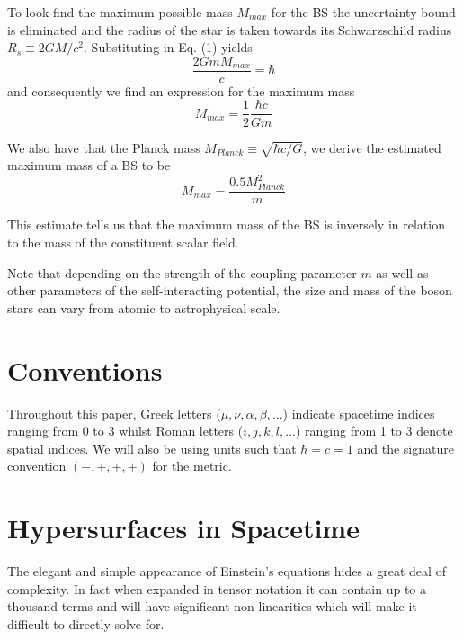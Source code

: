 \documentclass[12pt]{article}
\numberwithin{equation}{section}
\numberwithin{theorem}{subsection}
\begin{document}
 To look find the maximum possible mass $M_{max}$ for the BS the uncertainty bound is eliminated and the radius of the star is taken towards its Schwarzschild radius $R_{s} \equiv 2GM/c^2$. Substituting in Eq. (1) yields \begin{equation}

     \frac{2 Gm  M_{max}}{c} = \hbar

 \end{equation} and consequently we find an expression for the maximum mass \begin{equation}

     M_{max} = \frac{1}{2} \frac{\hbar c}{Gm}

 \end{equation}

 We also have that the Planck mass $M_{Planck} \equiv \sqrt{\hbar c/G}$, we derive the estimated maximum mass of a BS to be \begin{equation}

     M_{max}=\frac{0.5M^2_{Planck}}{m}

 \end{equation}

 This estimate tells us that the maximum mass of the BS is inversely in relation to the mass of the constituent scalar field. 

 Note that depending on the strength of the coupling parameter $m$ as well as other parameters of the self-interacting potential, the size and mass of the boson stars can vary from atomic to astrophysical scale.

 



\section{Conventions}

Throughout this paper, Greek letters ($\mu,\nu,\alpha,\beta,...$) indicate spacetime indices ranging from 0 to 3 whilst Roman letters ($i,j,k,l,...$) ranging from 1 to 3 denote spatial indices. We will also be using units such that $\hbar = c = 1$ and the signature convention $(-,+,+,+)$ for the metric.



\section{Hypersurfaces in Spacetime}

The elegant and simple appearance of Einstein's equations hides a great deal of complexity. In fact when expanded in tensor notation it can contain up to a thousand terms and will have significant non-linearities which will make it difficult to directly solve for. 
\end{document}
